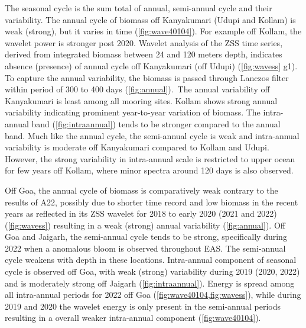 \documentclass{article}
\begin{document}
	The seasonal cycle is the sum total of annual, semi-annual cycle and their variability. The annual cycle of biomass off Kanyakumari (Udupi and Kollam) is weak (strong), but it varies in time (\cref{fig:wave40104}). For example off Kollam, the wavelet power is stronger post 2020. Wavelet analysis of the ZSS time series, derived from integrated biomass between 24 and 120 meters depth, indicates absence (presence) of annual cycle off Kanyakumari (off Udupi) (\cref{fig:wavess} g1). To capture the annual variability, the biomass is passed through Lanczos filter within period of 300 to 400 days (\cref{fig:annual}).~The annual variability off Kanyakumari is least among all mooring sites. Kollam shows strong annual variability indicating prominent year-to-year variation of biomass. The intra-annual band (\cref{fig:intraannual}) tends to be stronger compared to the annual band. Much like the annual cycle, the semi-annual cycle is weak and intra-annual variability is moderate off Kanyakumari compared to Kollam and Udupi. However, the strong variability in intra-annual scale is restricted to upper ocean for few years off Kollam, where minor spectra around 120 days is also observed.
	
	Off Goa, the annual cycle of biomass is comparatively weak contrary to the results of A22, possibly due to shorter time record and low biomass in the recent years as reflected in its ZSS wavelet for 2018 to early 2020 (2021 and 2022) (\cref{fig:wavess}) resulting in a weak (strong) annual variability (\cref{fig:annual}). Off Goa and Jaigarh, the semi-annual cycle tends to be strong, specifically during 2022 when a anomalous bloom is observed throughout EAS. The semi-annual cycle weakens with depth in these locations. Intra-annual component of seasonal cycle is observed off Goa, with weak (strong) variability during  2019 (2020, 2022) and is moderately strong off Jaigarh (\cref{fig:intraannual}). Energy is spread among all intra-annual periods for 2022 off Goa (\cref{fig:wave40104,fig:wavess}), while during 2019 and 2020 the wavelet energy is only present in the semi-annual periods resulting in a overall weaker intra-annual component (\cref{fig:wave40104}).
 
\end{document}

